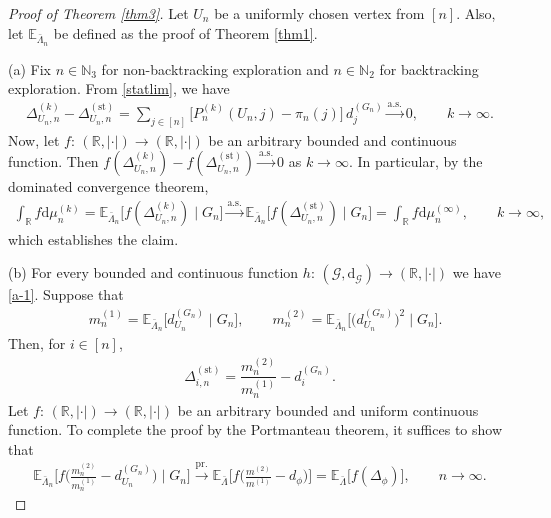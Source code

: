 \documentclass[11pt]{article}
\numberwithin{equation}{section}
\theoremstyle{plain}
\newcommand{\N}{\mathbb N}
\newcommand{\R}{\mathbb R}
\newcommand{\dd}{\mathrm{d}}
\newcommand{\prob}{\overset{\mathrm{pr.}}{\longrightarrow}}
\newcommand{\as}{\overset{\mathrm{a.s.}}{\longrightarrow}}
\newcommand{\E}{\mathbb E}
\newcommand{\dn}{d^{(G_{n})}}
\newcommand{\Dst}{\Delta^{(\mathrm{st})}}
\begin{document}
\begin{proof}[Proof of Theorem \ref{thm3}]
Let $U_{n}$ be a uniformly chosen vertex from $[n]$. Also, let $\E_{\bar{\Lambda}_{n}}$ be defined as the proof of Theorem \ref{thm1}.

\medskip\noindent
(a) Fix $n\in\N_{3}$ for non-backtracking exploration and $n\in\N_{2}$ for backtracking exploration. From \eqref{statlim}, we have
\begin{align*}
\Delta_{U_n,n}^{(k)}-\Dst_{U_n,n} =\sum_{j \in [n]} \big[P_{n}^{(k)}(U_n,j)-\pi_{n}(j)\big] \,d_{j}^{(G_{n})} 
\as 0, \qquad k\to \infty .
\end{align*}
Now, let $f\colon\,(\R ,|\cdot|) \to (\R ,|\cdot|)$ be an arbitrary bounded and continuous function. Then $f(\Delta_{U_n,n}^{(k)})-f(\Dst_{U_n,n} )\as 0$ as $k\to \infty$. In particular, by the dominated convergence theorem,
\begin{align*}
\int_\R f\dd\mu_{n}^{(k)} = \E_{\bar{\Lambda}_{n}}\big[f(\Delta_{U_n,n}^{(k)}) \mid G_{n}\big] \as \E_{\bar{\Lambda}_{n}}
\big[f(\Dst_{U_n,n} ) \mid G_{n}\big] = \int_\R f\dd\mu^{(\infty)}_{n}, \qquad k\to \infty,
\end{align*}
which establishes the claim.

\medskip\noindent
(b) For every bounded and continuous function $h\colon\,(\mathscr{G},\mathrm{d}_{\mathscr{G}}) \to (\R,\vert\cdot\vert)$ we have \eqref{a-1}. Suppose that
\begin{align}
\label{t62}
&m_{n}^{(1)} = \E_{\bar{\Lambda}_{n}}\Big[\dn_{U_{n}} \mid G_{n}\Big], 
\qquad
m_{n}^{(2)} = \E_{\bar{\Lambda}_{n}}\Big[\big(\dn_{U_{n}}\big)^{2} \mid G_{n}\Big]. 
\end{align}
Then, for $i\in[n]$, 
\begin{align*}
\Dst_{i,n}=\dfrac{m_{n}^{(2)}}{m_{n}^{(1)}}-\dn_{i}.
\end{align*}
Let $f\colon\,(\R ,\vert\cdot\vert) \to (\R ,\vert\cdot\vert)$ be an arbitrary bounded and uniform continuous function. To complete the proof by the Portmanteau theorem, it suffices to show that
\begin{align}
\label{kn1}
\E_{\bar{\Lambda}_{n}}\Big[f\Big(\frac{m_{n}^{(2)}}{m_{n}^{(1)}}-\dn_{U_n}\Big) \mid G_{n}\Big]\prob 
\E_{\bar{\Lambda}}\Big[f\Big(\frac{m^{(2)}}{m^{(1)}}-d_{\phi}\Big)\Big]=\E_{\bar{\Lambda}}\big[f(\Delta_{\phi})\big],
\qquad n\to\infty.
\end{align}


\end{proof}
\end{document}
